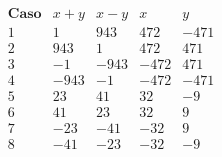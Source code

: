 \documentclass[a4paper,12pt]{article}
\begin{document}
\begin{ejercicio}[title=Ejercicio 18]
\vspace{1em}

\[
\boxed{
\begin{array}{c|c|c|c|c}
\textbf{Caso} & x + y & x - y & x & y \\
\hline
1 & 1 & 943 & 472 & -471 \\
2 & 943 & 1 & 472 & 471 \\
3 & -1 & -943 & -472 & 471 \\
4 & -943 & -1 & -472 & -471 \\
5 & 23 & 41 & 32 & -9 \\
6 & 41 & 23 & 32 & 9 \\
7 & -23 & -41 & -32 & 9 \\
8 & -41 & -23 & -32 & -9 \\
\end{array}
}
\]

\end{ejercicio}
\end{document}
